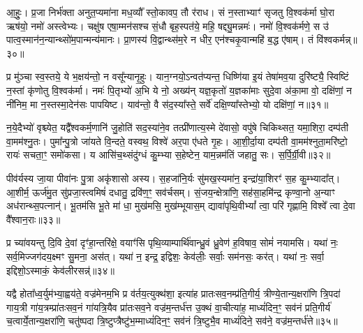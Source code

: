 आ॒हुः॒। प्र॒जा निर्भ॑क्ता अनुत॒प्यमा॑ना मध॒व्यौ᳚ स्तो॒कावप॒ तौ र॑राध। सं न॒स्ताभ्याꣳ॑ सृजतु वि॒श्वक॑र्मा घो॒रा ऋष॑यो॒ नमो॑ अस्त्वेभ्यः। चक्षु॑ष एषा॒म्मन॑सश्च सं॒धौ बृह॒स्पत॑ये॒ महि॒ षद्द्यु॒मन्नमः॑। नमो॑ वि॒श्वक॑र्मणे॒ स उ॑ पात्व॒स्मान॑न॒न्यान्थ्सो॑म॒पान्मन्य॑मानः। प्रा॒णस्य॑ वि॒द्वान्थ्स॑म॒रे न धीर॒ एन॑श्चकृ॒वान्महि॑ ब॒द्ध ए॑षाम्। तं वि॑श्वकर्मन्न्॥३०॥

प्र मु॑ञ्चा स्व॒स्तये॒ ये भ॒क्षय॑न्तो॒ न वसू᳚न्यानृ॒हुः। यान॒ग्नयो॒\-ऽन्वत॑प्यन्त॒ धिष्णि॑या इ॒यं तेषा॑मव॒या दुरि॑ष्ट्यै॒ स्विष्टिं न॒स्तां कृ॑णोतु वि॒श्वक॑र्मा। नमः॑ पि॒तृभ्यो॑ अ॒भि ये नो॒ अख्य॑न् यज्ञ॒कृतो॑ य॒ज्ञका॑माः सुदे॒वा अ॑का॒मा वो॒ दक्षि॑णां॒ न नी॑निम॒ मा न॒स्तस्मा॒देन॑सः पापयिष्ट। याव॑न्तो॒ वै स॑द॒स्या᳚स्ते॒ सर्वे॑ दक्षि॒ण्या᳚स्तेभ्यो॒ यो दक्षि॑णां॒ न॥३१॥

न॒ये॒दैभ्यो॑ वृश्च्येत॒ यद्वै᳚श्वकर्म॒णानि॑ जु॒होति॑ सद॒स्या॑ने॒व तत्प्री॑णात्य॒स्मे दे॑वासो॒ वपु॑षे चिकिथ्सत॒ यमा॒शिरा॒ दम्प॑ती वा॒मम॑श्नु॒तः। पुमा᳚न्पु॒त्रो जा॑यते वि॒न्दते॒ वस्वथ॒ विश्वे॑ अर॒पा ए॑धते गृ॒हः। आ॒शी॒र्दा॒या दम्प॑ती वा॒मम॑श्नुता॒मरि॑ष्टो॒ रायः॑ सचता॒ꣳ॒ समो॑कसा। य आसि॑च॒थ्संदु॑ग्धं कु॒म्भ्या स॒हेष्टेन॒ याम॒न्नम॑तिं जहातु॒ सः। स॒र्पि॒र्ग्री॒वी॥३२॥

पीव॑र्यस्य जा॒या पीवा॑नः पु॒त्रा अकृ॑शासो अस्य। स॒हजा॑नि॒र्यः सु॑मख॒स्यमा॑न॒ इन्द्रा॑या॒शिरꣳ॑ स॒ह कु॒म्भ्यादा᳚त्। आ॒शीर्म॒ ऊर्ज॑मु॒त सु॑प्रजा॒स्त्वमिषं॑ दधातु॒ द्रवि॑ण॒ꣳ॒ सव॑र्चसम्। सं॒जय॒न्क्षेत्रा॑णि॒ सह॑सा॒हमि॑न्द्र कृण्वा॒नो अ॒न्याꣳ अध॑रान्थ्स॒पत्नान्॑। भू॒तम॑सि भू॒ते मा॑ धा॒ मुख॑मसि॒ मुख॑म्भूयास॒म् द्यावा॑पृथि॒वी\-भ्यां᳚ त्वा॒ परि॑ गृह्णामि॒ विश्वे᳚ त्वा दे॒वा वै᳚श्वान॒राः॥३३॥

प्र च्या॑वयन्तु दि॒वि दे॒वां दृꣳ॑हा॒न्तरि॑क्षे॒ वयाꣳ॑सि पृथि॒व्याम्पार्थि॑वान्ध्रु॒वं ध्रु॒वेण॑ ह॒विषाव॒ सोमं॑ नयामसि। यथा॑ नः॒ सर्व॒मिज्जग॑दय॒क्ष्मꣳ सु॒मना॒ अस॑त्। यथा॑ न॒ इन्द्र॒ इद्विशः॒ केव॑लीः॒ सर्वाः॒ सम॑नसः॒ कर॑त्। यथा॑ नः॒ सर्वा॒ इद्दिशो॒\-ऽस्माकं॒ केव॑लीरसन्न्॑॥३४॥

{\anuvakamend[{एन॑सा विश्वकर्म॒न् यो दक्षि॑णां॒ न स॑र्पिर्ग्री॒वी वै᳚श्वान॒राश्च॑त्वारि॒ꣳ॒शच्च॑॥८॥}]}

यद्वै होता᳚ध्व॒र्युम॑भ्या॒ह्वय॑ते॒ वज्र॑मेनम॒भि प्र व॑र्तय॒त्युक्थ॑शा॒ इत्या॑ह प्रातःसव॒नम्प्र॑ति॒गीर्य॒ त्रीण्ये॒तान्य॒क्षरा॑णि त्रि॒पदा॑ गाय॒त्री गा॑य॒त्रम्प्रा॑तःसव॒नं गा॑यत्रि॒यैव प्रा॑तःसव॒ने वज्र॑म॒न्तर्ध॑त्त उ॒क्थं वा॒चीत्या॑ह॒ माध्यं॑दिन॒ꣳ॒ सव॑नं प्रति॒गीर्य॑ च॒त्वार्ये॒तान्य॒क्षरा॑णि॒ चतु॑ष्पदा त्रि॒ष्टुप्त्रैष्टु॑भ॒म्माध्यं॑दिन॒ꣳ॒ सव॑नं त्रि॒ष्टुभै॒व माध्यं॑दिने॒ सव॑ने॒ वज्र॑म॒न्तर्ध॑त्ते॥३५॥

